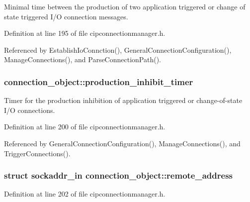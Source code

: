 \-Minimal time between the production of two application triggered or change of state triggered \-I/\-O connection messages. 



\-Definition at line 195 of file cipconnectionmanager.\-h.



\-Referenced by \-Establish\-Io\-Connction(), \-General\-Connection\-Configuration(), \-Manage\-Connections(), and \-Parse\-Connection\-Path().

\hypertarget{structconnection__object_a778d093e5752c80e5b7c043541054641}{
\subsubsection[{production\-\_\-inhibit\-\_\-timer}]{ {\bf connection\-\_\-object\-::production\-\_\-inhibit\-\_\-timer}}}\label{d1/d48/structconnection__object_a778d093e5752c80e5b7c043541054641}


\-Timer for the production inhibition of application triggered or change-\/of-\/state \-I/\-O connections. 



\-Definition at line 200 of file cipconnectionmanager.\-h.



\-Referenced by \-General\-Connection\-Configuration(), \-Manage\-Connections(), and \-Trigger\-Connections().

\hypertarget{structconnection__object_a32b8fe01a538f765d0cce564f705c2ea}{
\subsubsection[{remote\-\_\-address}]{\setlength{\rightskip}{0pt plus 5cm}struct sockaddr\-\_\-in {\bf connection\-\_\-object\-::remote\-\_\-address}}}\label{d1/d48/structconnection__object_a32b8fe01a538f765d0cce564f705c2ea}


\-Definition at line 202 of file cipconnectionmanager.\-h.



